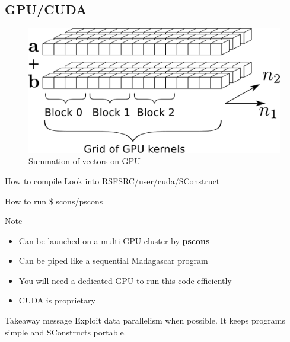 \subsection{GPU/CUDA}

\begin{frame}
  \begin{figure}
  \includegraphics[scale=0.55]{Fig/abcgpu.pdf}
  \caption{Summation of vectors on GPU}
  \end{figure}
\end{frame}

\begin{frame}
\end{frame}
\begin{frame}
\end{frame}
\begin{frame}
\end{frame}
\begin{frame}
\end{frame}

\begin{frame}
  \begin{block}{How to compile}
    Look into RSFSRC/user/cuda/SConstruct 
  \end{block}
  \begin{block}{How to run}
    \$ scons/pscons
  \end{block}
  \begin{block}{Note}
    \begin{itemize}
      \item Can be launched on a multi-GPU cluster by {\bf pscons}
      \item Can be piped like a sequential Madagascar program
      \item You will need a dedicated GPU to run this code efficiently
      \item CUDA is proprietary
    \end{itemize}
  \end{block}
\end{frame}

\begin{frame}
  \begin{block}{Takeaway message}
    Exploit data parallelism when possible. It keeps programs simple and
    SConstructs portable.
  \end{block}
\end{frame}

